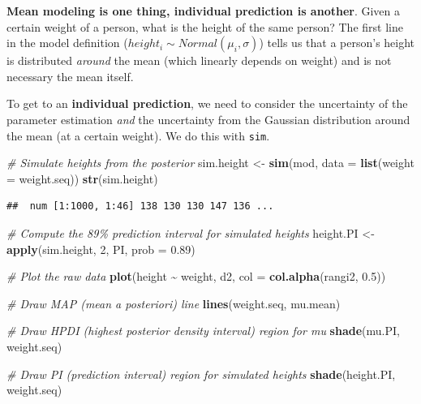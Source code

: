 \documentclass[
]{book}
\newenvironment{Shaded}{\begin{snugshade}}{\end{snugshade}}
\newcommand{\AttributeTok}[1]{\textcolor[rgb]{0.13,0.29,0.53}{#1}}
\newcommand{\CommentTok}[1]{\textcolor[rgb]{0.56,0.35,0.01}{\textit{#1}}}
\newcommand{\DecValTok}[1]{\textcolor[rgb]{0.00,0.00,0.81}{#1}}
\newcommand{\FloatTok}[1]{\textcolor[rgb]{0.00,0.00,0.81}{#1}}
\newcommand{\FunctionTok}[1]{\textcolor[rgb]{0.13,0.29,0.53}{\textbf{#1}}}
\newcommand{\NormalTok}[1]{#1}
\newcommand{\OtherTok}[1]{\textcolor[rgb]{0.56,0.35,0.01}{#1}}
\newcommand{\SpecialCharTok}[1]{\textcolor[rgb]{0.81,0.36,0.00}{\textbf{#1}}}
\begin{document}
\textbf{Mean modeling is one thing, individual prediction is another}.
Given a certain weight of a person, what is the height of the same person?
The first line in the model definition (\(height_i \sim Normal(\mu_i, \sigma)\))
tells us that a person's height is distributed \emph{around} the mean
(which linearly depends on weight) and is not necessary the mean itself.

To get to an \textbf{individual prediction}, we need to consider the uncertainty
of the parameter estimation \emph{and} the uncertainty from the Gaussian distribution
around the mean (at a certain weight). We do this with \texttt{sim}.

\begin{Shaded}
\begin{Highlighting}[]
\CommentTok{\# Simulate heights from the posterior}
\NormalTok{sim.height }\OtherTok{\textless{}{-}} \FunctionTok{sim}\NormalTok{(mod, }\AttributeTok{data =} \FunctionTok{list}\NormalTok{(}\AttributeTok{weight =}\NormalTok{ weight.seq))}
\FunctionTok{str}\NormalTok{(sim.height)}
\end{Highlighting}
\end{Shaded}

\begin{verbatim}
##  num [1:1000, 1:46] 138 130 130 147 136 ...
\end{verbatim}

\begin{Shaded}
\begin{Highlighting}[]
\CommentTok{\# Compute the 89\% prediction interval for simulated heights}
\NormalTok{height.PI }\OtherTok{\textless{}{-}} \FunctionTok{apply}\NormalTok{(sim.height, }\DecValTok{2}\NormalTok{, PI, }\AttributeTok{prob =} \FloatTok{0.89}\NormalTok{)}

\CommentTok{\# Plot the raw data}
\FunctionTok{plot}\NormalTok{(height }\SpecialCharTok{\textasciitilde{}}\NormalTok{ weight, d2, }\AttributeTok{col =} \FunctionTok{col.alpha}\NormalTok{(rangi2, }\FloatTok{0.5}\NormalTok{))}

\CommentTok{\# Draw MAP (mean a posteriori) line}
\FunctionTok{lines}\NormalTok{(weight.seq, mu.mean)}

\CommentTok{\# Draw HPDI (highest posterior density interval) region for mu}
\FunctionTok{shade}\NormalTok{(mu.PI, weight.seq)}

\CommentTok{\# Draw PI (prediction interval) region for simulated heights}
\FunctionTok{shade}\NormalTok{(height.PI, weight.seq)}
\end{Highlighting}
\end{Shaded}
\end{document}
